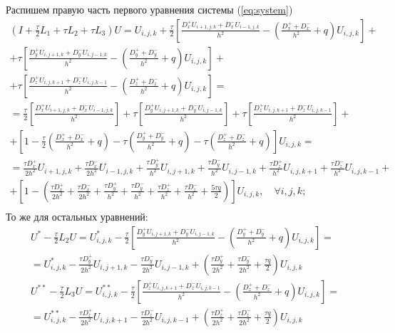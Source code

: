 \documentclass[a4paper,12pt]{article}
\begin{document}
Распишем правую часть первого уравнения системы (\ref{eq:system})
\begin{multline}
  \left( I + \frac{\tau}{2} L_1 +  \tau L_2 + \tau L_3 \right) U 
  = U_{i,j,k} + \frac{\tau}{2} \left[ \frac{D^+_x U_{i+1,j,k} + D^-_x U_{i-1,j,k}}{h^2} - \left(\frac{D^+_x + D^-_x}{h^2} + q \right) U_{i,j,k} \right] +  \\
  + \tau \left[ \frac{D^+_y U_{i,j+1,k} + D^-_y U_{i,j-1,k}}{h^2} - \left(\frac{D^+_y + D^-_y}{h^2} + q \right) U_{i,j,k} \right] + \\
  + \tau \left[ \frac{D^+_z U_{i,j,k+1} + D^-_z U_{i,j,k-1}}{h^2} - \left(\frac{D^+_z + D^-_z}{h^2} + q \right) U_{i,j,k} \right] = \\
  = \frac{\tau}{2} \left[ \frac{D^+_x U_{i+1,j,k} + D^-_x U_{i-1,j,k}}{h^2} \right] + \tau \left[\frac{D^+_y U_{i,j+1,k} + D^-_y U_{i,j-1,k}}{h^2} \right] + \tau \left[ \frac{D^+_z U_{i,j,k+1} + D^-_z U_{i,j,k-1}}{h^2} \right] + \\
  + \left[ 1 - \frac{\tau}{2} \left(\frac{D^+_x + D^-_x}{h^2} + q \right) - \tau \left(\frac{D^+_y + D^-_y}{h^2} + q \right) - \tau \left(\frac{D^+_z + D^-_z}{h^2} + q \right) \right] U_{i,j,k} = \\
  = \frac{\tau D^+_x}{2h^2} U_{i+1,j,k} + \frac{\tau D^-_x}{2h^2} U_{i-1,j,k} + \frac{\tau D^+_y}{h^2} U_{i,j+1,k} + \frac{\tau D^-_y}{h^2} U_{i,j-1,k} + \frac{\tau D^+_z}{h^2} U_{i,j,k+1} + \frac{\tau D^-_z}{h^2} U_{i,j,k-1} + \\
  + \left[ 1 - \left( \frac{\tau D^+_x}{2h^2} + \frac{\tau D^-_x}{2h^2} + \frac{\tau D^+_y}{h^2} + \frac{\tau D^-_y}{h^2} + \frac{\tau D^+_z}{h^2} + \frac{\tau D^-_z}{h^2} + \frac{5 \tau q}{2} \right) \right] U_{i,j,k} , \quad \forall i,j,k; \\
\end{multline}
То же для остальных уравнений:
\begin{equation*}
  \begin{aligned}
    U^{*} - \frac{\tau}{2} L_2 U = U^{*}_{i,j,k} - \frac{\tau}{2} \left[ \frac{D^+_y U_{i,j+1,k} + D^-_y U_{i,j-1,k}}{h^2} - \left(\frac{D^+_y + D^-_y}{h^2} + q \right) U_{i,j,k} \right] = \\
 = U^{*}_{i,j,k} - \frac{\tau D^+_y}{2 h^2} U_{i,j+1,k} - \frac{\tau D^-_y}{2 h^2} U_{i,j-1,k} + \left( \frac{\tau D^+_y}{2 h^2} + \frac{\tau D^-_y}{2 h^2} + \frac{\tau q}{2}  \right) U_{i,j,k} \\
    U^{**} - \frac{\tau}{2} L_3 U = U^{**}_{i,j,k} - \frac{\tau}{2} \left[ \frac{D^+_z U_{i,j,k+1} + D^-_z U_{i,j,k-1}}{h^2} - \left(\frac{D^+_z + D^-_z}{h^2} + q \right) U_{i,j,k} \right] = \\
    = U^{**}_{i,j,k} - \frac{\tau D^+_z}{2h^2} U_{i,j,k+1} - \frac{\tau D^-_z}{2h^2} U_{i,j,k-1} + \left(\frac{\tau D^+_z}{2h^2} +\frac{\tau D^-_z}{2h^2} + \frac{\tau q}{2} \right) U_{i,j,k}
  \end{aligned}
\end{equation*}
\end{document}
